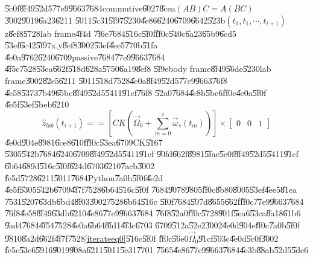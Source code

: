 \documentclass[12pt,a4paper]{article}
\begin{document}
\U{5c0f}\U{8f49}\U{52d5}\U{77e9}\U{9663}\U{7684}commutive\U{6027}\U{8cea}$%
\left( AB\right) C=A\left( BC\right) $\U{3002}\U{9019}\U{6a23}\U{6211}%
\U{5011}\U{5c31}\U{5f97}\U{5230}\U{4e86}\U{6240}\U{6709}\U{6642}\U{523b}$%
\left( t_{0},t_{1},\cdots ,t_{i+1}\right) $z\U{8ef8}\U{5728}lab frame\U{4f4d}%
\U{7f6e}\U{7684}\U{516c}\U{5f0f}\U{ff0c}\U{540c}\U{6a23}\U{65b9}\U{6cd5}%
\U{53ef}\U{6c42}\U{5f97}x,y\U{8ef8}\U{3002}\U{53ef}\U{4ee5}\U{770b}\U{51fa}%
\U{4e0a}\U{9762}\U{6240}\U{6709}passive\U{7684}\U{77e9}\U{9663}\U{7684}%
\U{4f5c}\U{7528}\U{53ea}\U{662f}\U{518d}\U{628a}\U{5750}\U{6a19}\U{8ef8}%
\U{5f9e}body frame\U{8f49}\U{56de}\U{5230}lab frame\U{3002}\U{82e5}\U{6211}%
\U{5011}\U{518d}\U{7528}\U{4e0a}\U{8f49}\U{52d5}\U{77e9}\U{9663}\U{76f8}%
\U{4e58}\U{5373}\U{7b49}\U{65bc}\U{8f49}\U{52d5}\U{5411}\U{91cf}\U{76f8}%
\U{52a0}\U{7684}\U{4e8b}\U{5be6}\cite{goldstein}\U{ff0c}\U{4e0a}\U{5f0f}%
\U{4e5f}\U{53ef}\U{5beb}\U{6210}%
\begin{equation}
\hat{z}_{lab}\left( t_{i+1}\right) ==\left[ CK\left( \vec{\Omega}%
_{0}+\sum\limits_{m=0}^{i}\vec{\omega}_{s}\left( t_{m}\right) \right) \right]
\times \left[ 
\begin{array}{ccc}
0 & 0 & 1%
\end{array}%
\right]  \label{iterateeq2}
\end{equation}%
\U{4e0d}\U{904e}\U{8981}\U{6ce8}\U{610f}\U{ff0c}\U{53ea}\U{6709}CK\U{5167}%
\U{5305}\U{542b}\U{7684}\U{6240}\U{6709}\U{8f49}\U{52d5}\U{5411}\U{91cf}%
\U{90fd}\U{662f}\U{8981}\U{5fae}\U{5c0f}\U{8f49}\U{52d5}\U{5411}\U{91cf}%
\U{6b64}\U{689d}\U{516c}\U{5f0f}\U{624d}\U{6703}\U{6210}\U{7acb}\U{3002}%
\U{fe5d}\U{5728}\U{6211}\U{5011}\U{7684}Python\U{7a0b}\U{5f0f}\U{4e2d}%
\U{4e5f}\U{5305}\U{542b}\U{6709}\U{4f7f}\U{7528}\U{6b64}\U{516c}\U{5f0f}%
\U{7684}\U{9078}\U{9805}\U{ff0c}\U{8b80}\U{8005}\U{53ef}\U{4ee5}\U{81ea}%
\U{7531}\U{5207}\U{63db}\U{6bd4}\U{8f03}\U{3002}\U{7528}\U{6b64}\U{516c}%
\U{5f0f}\U{7684}\U{597d}\U{8655}\U{662f}\U{ff0c}\U{77e9}\U{9663}\U{7684}%
\U{76f8}\U{4e58}\U{8f49}\U{63db}\U{6210}\U{4e86}\U{77e9}\U{9663}\U{7684}%
\U{76f8}\U{52a0}\U{ff0c}\U{5728}\U{901f}\U{5ea6}\U{53ca}\U{8a18}\U{61b6}%
\U{9ad4}\U{7684}\U{4f54}\U{7528}\U{4e0a}\U{6b64}\U{8fd1}\U{4f3c}\U{6703}%
\U{6709}\U{512a}\U{52e2}\U{3002}\U{4e0d}\U{904e}\U{ff0c}\U{7a0b}\U{5f0f}%
\U{9810}\U{8a2d}\U{662f}\U{4f7f}\U{7528}\ref{iterateeq0}\U{516c}\U{5f0f}%
\U{ff0c}\U{56e0}$\vec{\Omega}_{0}$\U{91cf}\U{503c}\U{4e0d}\U{5c0f}\U{3002}%
\U{fe5e}\U{53e6}\U{5916}\U{9019}\U{908a}\U{6211}\U{5011}\U{5c31}\U{7701}%
\U{7565}\U{4e86}\U{77e9}\U{9663}\U{7684}\U{4e3b}\U{88ab}\U{52d5}\U{5de6}%
\end{document}
